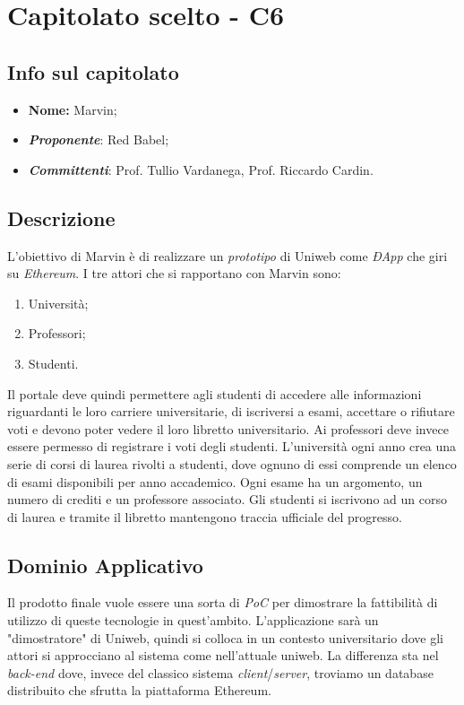 \newpage
\section{Capitolato scelto - C6}
\subsection{Info sul capitolato}
\begin{itemize}
	\item \textbf{Nome:} Marvin;
	\item \textbf{\textit{Proponente}}: Red Babel;
	\item \textbf{\textit{Committenti}}: Prof. Tullio Vardanega, Prof. Riccardo Cardin.
\end{itemize}

\subsection{Descrizione}
L'obiettivo di Marvin è di realizzare un \textit{prototipo} di Uniweb come \textit{ÐApp} che giri su \textit{Ethereum}. I tre attori che si rapportano con Marvin sono:
\begin{enumerate}
	\item Università;
	\item Professori;
	\item Studenti.
\end{enumerate}
Il portale deve quindi permettere agli studenti di accedere alle informazioni riguardanti le loro carriere universitarie, di iscriversi a esami, accettare o rifiutare voti e devono poter vedere il loro libretto universitario.
Ai professori deve invece essere permesso di registrare i voti degli studenti.
L'università ogni anno crea una serie di corsi di laurea rivolti a studenti, dove  ognuno di essi comprende un elenco di esami disponibili per anno accademico. Ogni esame ha un argomento, un numero di crediti e un professore associato. Gli studenti si iscrivono ad un corso di laurea e tramite il libretto mantengono traccia ufficiale del progresso.

\subsection{Dominio Applicativo}
Il prodotto finale vuole essere una sorta di \textit{PoC} per dimostrare la fattibilità di utilizzo di queste tecnologie in quest'ambito. L'applicazione sarà un "dimostratore" di Uniweb, quindi si colloca in un contesto universitario dove gli attori si approcciano al sistema come nell'attuale uniweb. La differenza sta nel \textit{back-end} dove, invece del classico sistema \textit{client}/\textit{server}, troviamo un database distribuito che sfrutta la piattaforma Ethereum. 

